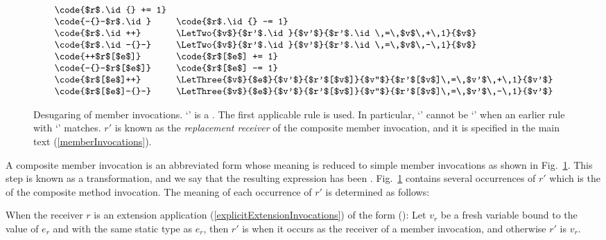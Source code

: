 \documentclass[makeidx]{article}
\begin{document}
{\begin{figure}[t]
\begin{minipage}[h]{\textwidth}
\begin{displaymath}
\begin{array}{ll}
        \code{$r$.\id{} += 1}
        \\
        \code{-{}-$r$.\id} &
        \code{$r$.\id{} -= 1}
        \\
        \code{$r$.\id++} &
        \LetTwo{$v$}{$r'$.\id}{$v'$}{$r'$.\id\,=\,$v$\,+\,1}{$v$}
        \\
        \code{$r$.\id-{}-} &
        \LetTwo{$v$}{$r'$.\id}{$v'$}{$r'$.\id\,=\,$v$\,-\,1}{$v$}
        \\
        \code{++$r$[$e$]} &
        \code{$r$[$e$] += 1}
        \\
        \code{-{}-$r$[$e$]} &
        \code{$r$[$e$] -= 1}
        \\
        \code{$r$[$e$]++} &
        \LetThree{$v$}{$e$}{$v'$}{$r'$[$v$]}{$v''$}{%
          $r'$[$v$]\,=\,$v'$\,+\,1}{$v'$}
        \\
        \code{$r$[$e$]-{}-} &
        \LetThree{$v$}{$e$}{$v'$}{$r'$[$v$]}{$v''$}{%
          $r'$[$v$]\,=\,$v'$\,-\,1}{$v'$}
      \end{array}
    \end{displaymath}
  \end{minipage}
  \caption{Desugaring of member invocations.
    `\code{$\otimes$=}' is a .
    The first applicable rule is used.
    In particular, `\code{$\otimes$=}' cannot be `'
    when an earlier rule with `' matches.
    $r'$ is known as the \emph{replacement receiver} of
    the composite member invocation,
    and it is specified in the main text
    (\ref{memberInvocations}).}
  \label{fig:desugarCompositeMemberInvocations}
\end{figure}

\LMHash{}%
A composite member invocation is an abbreviated form
whose meaning is reduced to simple member invocations
as shown in Fig.~\ref{fig:desugarCompositeMemberInvocations}.
This step is known as a  transformation,
and we say that the resulting expression has been .
Fig.~\ref{fig:desugarCompositeMemberInvocations} contains
several occurrences of $r'$
which is the
of the composite method invocation.
The meaning of each occurrence of $r'$ is determined as follows:

\LMHash{}%
When the receiver $r$ is an extension application
(\ref{explicitExtensionInvocations})
of the form 
():
Let $v_r$ be a fresh variable bound to the value of $e_r$
and with the same static type as $e_r$,
then $r'$ is  when it occurs
as the receiver of a member invocation,
and otherwise $r'$ is $v_r$.

}
\end{document}
